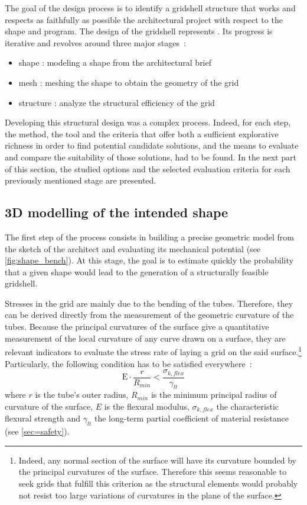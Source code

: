 The goal of the design process is to identify a gridshell structure that works and respects as faithfully as possible the architectural project with respect to the shape and program. The design of the gridshell represents . Its progress is iterative and revolves around three major stages~:
\begin{itemize}
\item shape : modeling a shape from the architectural brief
\item mesh : meshing the shape to obtain the geometry of the grid
\item structure : analyze the structural efficiency of the grid
\end{itemize}
Developing this structural design was a complex process. Indeed, for each step, the method, the tool and the criteria that offer both a sufficient explorative richness in order to find potential candidate solutions, and the means to evaluate and compare the suitability of those solutions, had to be found. In the next part of this section, the studied options and the selected evaluation criteria for each previously mentioned stage are presented.

\subsection{3D modelling of the intended shape}
The first step of the process consists in building a precise geometric model from the sketch of the architect and evaluating its mechanical potential (see \cref{fig:shape_bench}). At this stage, the goal is to estimate quickly the probability that a given shape would lead to the generation of a structurally feasible gridshell.

Stresses in the grid are mainly due to the bending of the tubes. Therefore, they can be derived directly from the measurement of the geometric curvature of the tubes. Because the principal curvatures of the surface give a quantitative measurement of the local curvature of any curve drawn on a surface, they are relevant indicators to evaluate the stress rate of laying a grid on the said surface.\footnote{Indeed, any normal section of the surface will have its curvature bounded by the principal curvatures of the surface. Therefore this seems reasonable to seek grids that fulfill this criterion as the structural elements would probably not resist too large variations of curvatures in the plane of the surface.} Particularly, the following condition has to be satisfied everywhere~:
\begin{equation}
	\mathrm{E} \cdot \frac{r}{R_{min}} < \frac{\sigma_{k,flex}}{\gamma_{lt}}
	\label{eq:crit_1}
\end{equation}
where $r$ is the tube’s outer radius, $R_{min}$ is the minimum principal radius of curvature of the surface, $E$ is the flexural modulus, $\sigma_{k,flex}$ the characteristic flexural strength and $\gamma_{lt}$ the long-term partial coefficient of material resistance (see \cref{sec=safety}).

